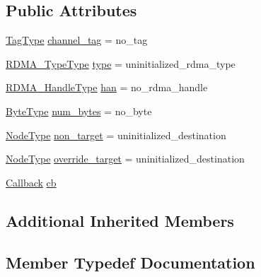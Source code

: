 \subsection*{Public Attributes}
\begin{DoxyCompactItemize}
\item 
\hyperlink{namespacevt_a84ab281dae04a52a4b243d6bf62d0e52}{Tag\+Type} \hyperlink{structvt_1_1rdma_1_1_channel_message_ae9a6b2fc52d68e41c051e760f8ca9fa9}{channel\+\_\+tag} = no\+\_\+tag
\item 
\hyperlink{namespacevt_1_1rdma_ac848e1d9da43db6294bd06f83e5d3946}{R\+D\+M\+A\+\_\+\+Type\+Type} \hyperlink{structvt_1_1rdma_1_1_channel_message_a325d169e844b5de16a885852841ec25a}{type} = uninitialized\+\_\+rdma\+\_\+type
\item 
\hyperlink{namespacevt_a10442579ec4e7ebef223818e64bcf908}{R\+D\+M\+A\+\_\+\+Handle\+Type} \hyperlink{structvt_1_1rdma_1_1_channel_message_a9c91ffd641d8e7b05a4ee6999aad3cc1}{han} = no\+\_\+rdma\+\_\+handle
\item 
\hyperlink{namespacevt_aab8d55968084610ce3b17057981e9300}{Byte\+Type} \hyperlink{structvt_1_1rdma_1_1_channel_message_ae6eacd8bc1177ce518f8cf061163a9e5}{num\+\_\+bytes} = no\+\_\+byte
\item 
\hyperlink{namespacevt_a866da9d0efc19c0a1ce79e9e492f47e2}{Node\+Type} \hyperlink{structvt_1_1rdma_1_1_channel_message_a74a29aa6eedac5f27939642e81d31c59}{non\+\_\+target} = uninitialized\+\_\+destination
\item 
\hyperlink{namespacevt_a866da9d0efc19c0a1ce79e9e492f47e2}{Node\+Type} \hyperlink{structvt_1_1rdma_1_1_channel_message_a6becb5011a81e9e52210f075406f848c}{override\+\_\+target} = uninitialized\+\_\+destination
\item 
\hyperlink{namespacevt_a57b238783d05de96bc2c4027f7073b7f}{Callback} \hyperlink{structvt_1_1rdma_1_1_channel_message_a70ba36eb1157e5c095c5acc79f9ba4f4}{cb}
\end{DoxyCompactItemize}
\subsection*{Additional Inherited Members}


\subsection{Member Typedef Documentation}
\mbox{\label{structvt_1_1rdma_1_1_channel_message_a8cd82de8b91d466fbae2abf28e668c0c}} 
